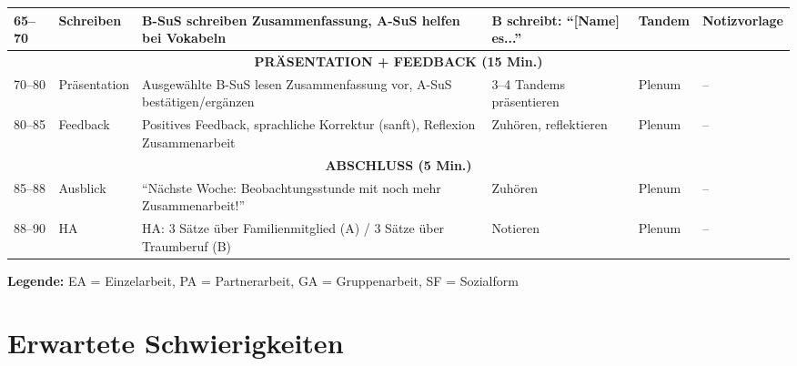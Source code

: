 \documentclass[11pt,a4paper]{article}
\begin{document}
\begin{longtable}{|p{0.8cm}|p{1.5cm}|p{4cm}|p{3cm}|p{1.5cm}|p{2cm}|}
65--70 & \textcolor{overlap}{Schreiben} & \textcolor{overlap}{B-SuS schreiben Zusammenfassung, A-SuS helfen bei Vokabeln} & \textcolor{overlap}{B schreibt: ``[Name] es...''} & \textcolor{overlap}{Tandem} & \textcolor{overlap}{Notizvorlage} \\
\hline

\multicolumn{6}{|c|}{\textbf{PRÄSENTATION + FEEDBACK (15 Min.)}} \\
\hline

70--80 & Präsentation & Ausgewählte B-SuS lesen Zusammenfassung vor, A-SuS bestätigen/ergänzen & 3--4 Tandems präsentieren & Plenum & -- \\
\hline

80--85 & Feedback & Positives Feedback, sprachliche Korrektur (sanft), Reflexion Zusammenarbeit & Zuhören, reflektieren & Plenum & -- \\
\hline

\multicolumn{6}{|c|}{\textbf{ABSCHLUSS (5 Min.)}} \\
\hline

85--88 & Ausblick & ``Nächste Woche: Beobachtungsstunde mit noch mehr Zusammenarbeit!'' & Zuhören & Plenum & -- \\
\hline

88--90 & HA & HA: 3 Sätze über Familienmitglied (A) / 3 Sätze über Traumberuf (B) & Notieren & Plenum & -- \\
\hline

\end{longtable}

\textbf{Legende:} EA = Einzelarbeit, PA = Partnerarbeit, GA = Gruppenarbeit, SF = Sozialform

\section{Erwartete Schwierigkeiten}
\end{document}
